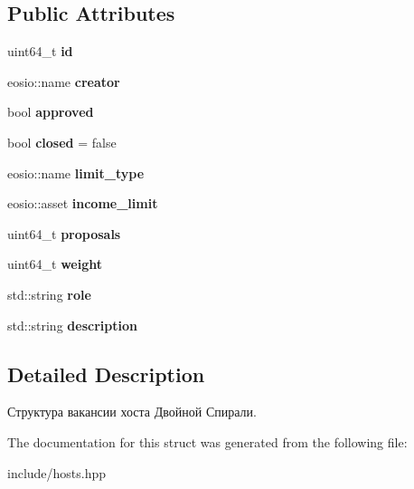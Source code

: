\subsection*{Public Attributes}
\begin{DoxyCompactItemize}
\item 
\mbox{\label{structvacs_a7ee15c9203c307f828103e1ff269f5d7}} 
uint64\+\_\+t {\bfseries id}
\item 
\mbox{\label{structvacs_a92789d98dd7c5145119308688279e71b}} 
eosio\+::name {\bfseries creator}
\item 
\mbox{\label{structvacs_a8a85a9aa09a4715080494b176ca3d406}} 
bool {\bfseries approved}
\item 
\mbox{\label{structvacs_a11f60e17d33622d6e4309dd8ae08e18f}} 
bool {\bfseries closed} = false
\item 
\mbox{\label{structvacs_afa646f5dc2e17215ba4b0d72b4d67b2c}} 
eosio\+::name {\bfseries limit\+\_\+type}
\item 
\mbox{\label{structvacs_aae267f9df7a2cb666adb997126387dc1}} 
eosio\+::asset {\bfseries income\+\_\+limit}
\item 
\mbox{\label{structvacs_a117f42cdc01ba0d853cbb9f9015e8e99}} 
uint64\+\_\+t {\bfseries proposals}
\item 
\mbox{\label{structvacs_a9cb7a2c336ca54c69178a6cbc488ffb4}} 
uint64\+\_\+t {\bfseries weight}
\item 
\mbox{\label{structvacs_aeef598457e4bef3ff3c02eb77d5b0177}} 
std\+::string {\bfseries role}
\item 
\mbox{\label{structvacs_a32302c94a14ab33a5722b03f7ab850a9}} 
std\+::string {\bfseries description}
\end{DoxyCompactItemize}


\subsection{Detailed Description}
Структура вакансии хоста Двойной Спирали. 

The documentation for this struct was generated from the following file\+:\begin{DoxyCompactItemize}
\item 
include/hosts.\+hpp\end{DoxyCompactItemize}
